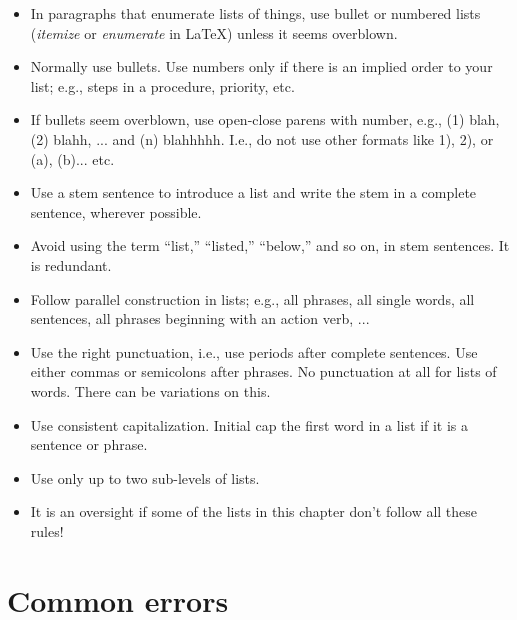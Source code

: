 \begin{itemize}
\item In paragraphs that enumerate lists of things, use bullet or numbered lists (\textit{itemize} or \textit{enumerate} in LaTeX) unless it seems overblown.
\item Normally use bullets. Use numbers only if there is an implied order to your list; e.g., steps in a procedure, priority, etc.
\item If bullets seem overblown,  use open-close parens with number, e.g., (1) blah, (2) blahh, ... and (n) blahhhhh. I.e., do not use other formats like 1), 2), or (a), (b)... etc.
\item Use a stem sentence to introduce a list and write the stem in a complete sentence, wherever possible.
\item Avoid using the term ``list,'' ``listed,'' ``below,'' and so on, in stem sentences. It is redundant. 
\item Follow parallel construction in lists; e.g., all phrases, all single words, all sentences, all phrases beginning with an action verb, ...
\item Use the right punctuation, i.e., use periods after complete sentences. Use either commas or semicolons after phrases. No punctuation at all for lists of words. There can be variations on this.
\item Use consistent capitalization. Initial cap the first word in a list if it is a sentence or phrase. 
\item Use only up to two sub-levels of lists.
\item It is an oversight if some of the lists in this chapter don't follow all these rules!
\end{itemize}

\section{Common errors}
\label{sec:english-errors}

